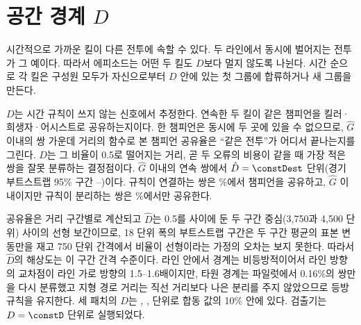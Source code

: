 \section{공간 경계 $D$}
\label{sec:eng-spatial}

시간적으로 가까운 킬이 다른 전투에 속할 수 있다. 두 라인에서 동시에 벌어지는 전투가 그 예이다. 따라서 에피소드는 어떤 두 킬도 $D$보다 멀지 않도록 나뉜다. 시간 순으로 각 킬은 구성원 모두가 자신으로부터 $D$ 안에 있는 첫 그룹에 합류하거나 새 그룹을 만든다.

$D$는 시간 규칙이 쓰지 않는 신호에서 추정한다. 연속한 두 킬이 같은 챔피언을 킬러·희생자·어시스트로 공유하는지이다. 한 챔피언은 동시에 두 곳에 있을 수 없으므로, $\hat G$ 이내의 쌍 가운데 거리의 함수로 본 챔피언 공유율은 ``같은 전투''가 어디서 끝나는지를 그린다. $D$는 그 비율이 0.5로 떨어지는 거리, 곧 두 오류의 비용이 같을 때 가장 적은 쌍을 잘못 분류하는 결정점이다. $\hat G$ 이내의 \numPairsDef{} 연속 쌍에서 $\hat D = \constDest$ 단위(경기 부트스트랩 95\% 구간 \constDciLo{}--\constDciHi{})이다. 규칙이 연결하는 쌍은 \shareLinkedPairs{}\%에서 챔피언을 공유하고, $\hat G$ 이내이지만 규칙이 분리하는 쌍은 \shareSeparatedPairs{}\%에서만 공유한다.

공유율은 거리 구간별로 계산되고 $\hat D$는 0.5를 사이에 둔 두 구간 중심(3{,}750과 4{,}500 단위) 사이의 선형 보간이므로, 18 단위 폭의 부트스트랩 구간은 두 구간 평균의 표본 변동만을 재고 750 단위 간격에서 비율이 선형이라는 가정의 오차는 보지 못한다. 따라서 $\hat D$의 해상도는 이 구간 간격 수준이다. 라인 안에서 경계는 비등방적이어서 라인 방향의 교차점이 라인 가로 방향의 1.5--1.6배이지만, 타원 경계는 파일럿에서 0.16\%의 쌍만을 다시 분류했고 지형 경로 거리는 직선 거리보다 나은 분리를 주지 않았으므로 등방 규칙을 유지한다. 세 패치의 $D$는 \constDpatchA{}, \constDpatchB{}, \constDpatchC{} 단위로 합동 값의 10\% 안에 있다. 검출기는 $D = \constD$ 단위로 실행되었다.
